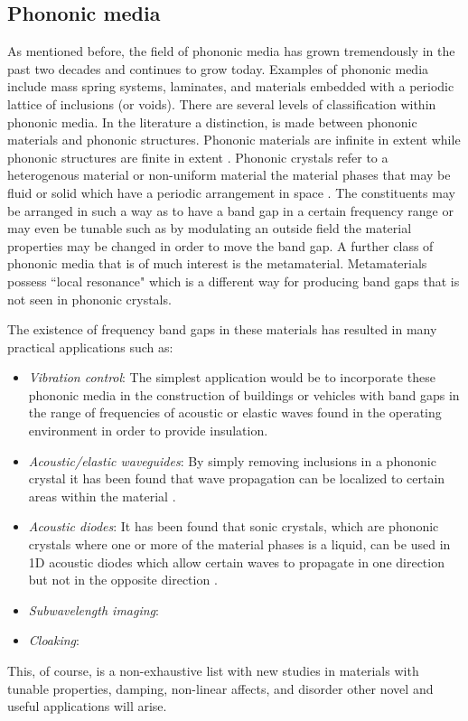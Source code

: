 \documentclass{article}
\begin{document}
\subsection{Phononic media}
As mentioned before, the field of phononic media has grown tremendously in the 
past two decades and continues to grow today. Examples of phononic media 
include mass spring systems, laminates, and materials embedded with a periodic 
lattice of inclusions (or voids). There are several levels of classification 
within phononic media. In the literature a distinction, is made between 
phononic materials and phononic structures. Phononic materials are infinite in 
extent while phononic structures are finite in extent \cite{hussein10}. 
Phononic crystals refer to a heterogenous material or non-uniform material the 
material phases that may be fluid or solid which have a periodic arrangement in 
space \cite{hussein14}. The constituents may be arranged in such a way as to 
have a band gap in a certain frequency range or may even be tunable such as by 
modulating an outside field the material properties may be changed in order to 
move the band gap. A further class of phononic media that is of much interest 
is the metamaterial. Metamaterials possess ``local resonance" which is a 
different way for producing band gaps that is not seen in phononic crystals. 

The existence of frequency band gaps in these materials has resulted in many 
practical applications such as:
\begin{itemize}
	\item \emph{Vibration control}: The simplest application would be to 
	incorporate these phononic media in the construction of buildings or 
	vehicles with band gaps in the range of frequencies of acoustic or elastic 
	waves found in the operating environment in order to provide insulation.
	\item \emph{Acoustic/elastic waveguides}: By simply removing inclusions in 
	a phononic crystal it has been found that wave propagation can be localized 
	to certain areas within the material \cite{hou12}. 
	\item \emph{Acoustic diodes}: It has been found that sonic 
	crystals, which are phononic crystals where one or more of the material 
	phases is a liquid, can be used in 1D acoustic diodes which allow certain 
	waves to propagate in one direction but not in the opposite direction 
	\cite{zhang10}.
	\item \emph{Subwavelength imaging}:
	\item \emph{Cloaking}:
\end{itemize}
This, of course, is a non-exhaustive list with new studies in materials with 
tunable properties, damping, non-linear affects, and disorder other novel and 
useful applications will arise.
\end{document}
